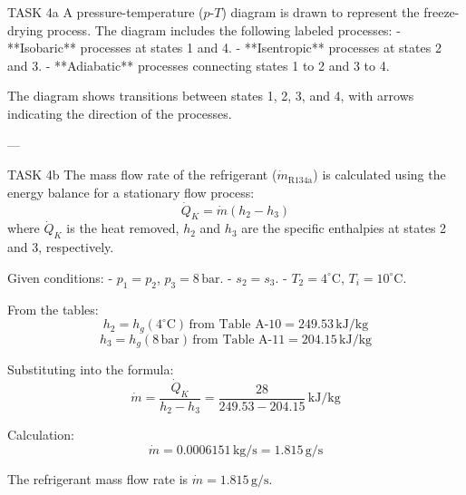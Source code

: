 TASK 4a  
A pressure-temperature (\( p \)-\( T \)) diagram is drawn to represent the freeze-drying process. The diagram includes the following labeled processes:  
- **Isobaric** processes at states 1 and 4.  
- **Isentropic** processes at states 2 and 3.  
- **Adiabatic** processes connecting states 1 to 2 and 3 to 4.  

The diagram shows transitions between states 1, 2, 3, and 4, with arrows indicating the direction of the processes.

---

TASK 4b  
The mass flow rate of the refrigerant (\( \dot{m}_{\text{R134a}} \)) is calculated using the energy balance for a stationary flow process:  
\[
\dot{Q}_K = \dot{m} (h_2 - h_3)
\]  
where \( \dot{Q}_K \) is the heat removed, \( h_2 \) and \( h_3 \) are the specific enthalpies at states 2 and 3, respectively.

Given conditions:  
- \( p_1 = p_2 \), \( p_3 = 8 \, \text{bar} \).  
- \( s_2 = s_3 \).  
- \( T_2 = 4^\circ\text{C} \), \( T_i = 10^\circ\text{C} \).  

From the tables:  
\[
h_2 = h_g(4^\circ\text{C}) \, \text{from Table A-10} = 249.53 \, \text{kJ/kg}
\]  
\[
h_3 = h_g(8 \, \text{bar}) \, \text{from Table A-11} = 204.15 \, \text{kJ/kg}
\]

Substituting into the formula:  
\[
\dot{m} = \frac{\dot{Q}_K}{h_2 - h_3} = \frac{28}{249.53 - 204.15} \, \text{kJ/kg}
\]

Calculation:  
\[
\dot{m} = 0.0006151 \, \text{kg/s} = 1.815 \, \text{g/s}
\]  

The refrigerant mass flow rate is \( \dot{m} = 1.815 \, \text{g/s} \).